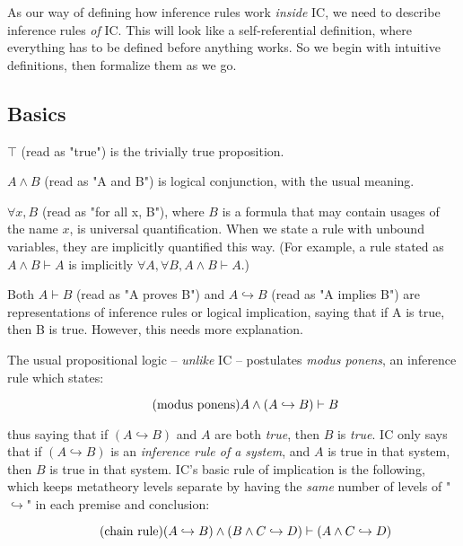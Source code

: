 \documentclass{article}
\begin{document}
  As our way of defining how inference rules work \emph{inside} IC, we need to describe inference rules \emph{of} IC. This will look like a self-referential definition, where everything has to be defined before anything works. So we begin with intuitive definitions, then formalize them as we go.
    
  \subsection{Basics}
  
  $\top$ (read as "true") is the trivially true proposition.
  
  $A \wedge B$ (read as "A and B") is logical conjunction, with the usual meaning.

  \newcommand{\objto}{\hookrightarrow}
  $\forall x, B$ (read as "for all x, B"), where $B$ is a formula that may contain usages of the name $x$, is universal quantification. When we state a rule with unbound variables, they are implicitly quantified this way. (For example, a rule stated as $A \wedge B \vdash A$ is implicitly $\forall A, \forall B, A \wedge B \vdash A$.)
  
  Both $A \vdash B$ (read as "A proves B") and $A \objto B$ (read as "A implies B") are representations of inference rules or logical implication, saying that if A is true, then B is true. However, this needs more explanation.
  
  The usual propositional logic – \emph{unlike} IC – postulates \emph{modus ponens}, an inference rule which states:
  
  \begin{equation*}
    \tag{modus ponens}
    A \wedge (A \objto B) \vdash B\\
  \end{equation*}
  
  thus saying that if $(A \objto B)$ and $A$ are both \emph{true}, then $B$ is \emph{true}. IC only says that if $(A \objto B)$ is an \emph{inference rule of a system}, and $A$ is true in that system, then $B$ is true in that system. IC's basic rule of implication is the following, which keeps metatheory levels separate by having the \emph{same} number of levels of "$\objto$" in each premise and conclusion:
  
  \begin{equation*}
    \tag{chain rule}
    (A \objto B) \wedge (B \wedge C \objto D) \vdash (A \wedge C \objto D)\\
  \end{equation*}
  
\end{document}
